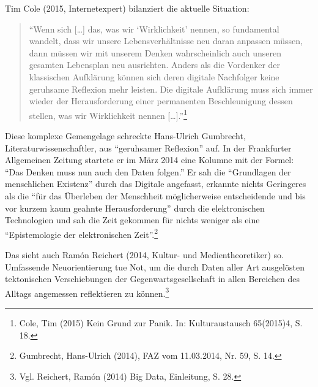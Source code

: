 \documentclass[a4paper,
fontsize=11pt,
oneside,
numbers=noperiodatend,
parskip=half-,
bibliography=totoc,
final
]{scrartcl}
\begin{document}
Tim Cole (2015, Internetexpert) bilanziert die aktuelle Situation:

\begin{quote}
\enquote{Wenn sich {[}\ldots{}{]} das, was wir \enquote{Wirklichkeit}
nennen, so fundamental wandelt, dass wir unsere Lebensverhältnisse neu
daran anpassen müssen, dann müssen wir mit unserem Denken wahrscheinlich
auch unseren gesamten Lebensplan neu ausrichten. Anders als die
Vordenker der klassischen Aufklärung können sich deren digitale
Nachfolger keine geruhsame Reflexion mehr leisten. Die digitale
Aufklärung muss sich immer wieder der Herausforderung einer permanenten
Beschleunigung dessen stellen, was wir Wirklichkeit nennen
{[}\ldots{}{]}.}\footnote{Cole, Tim (2015) Kein Grund zur Panik. In:
  Kulturaustausch 65(2015)4, S. 18.}
\end{quote}

Diese komplexe Gemengelage schreckte Hans-Ulrich Gumbrecht,
Literaturwissenschaftler, aus \enquote{geruhsamer Reflexion} auf. In der
Frankfurter Allgemeinen Zeitung startete er im März 2014 eine Kolumne
mit der Formel: \enquote{Das Denken muss nun auch den Daten folgen.} Er
sah die \enquote{Grundlagen der menschlichen Existenz} durch das
Digitale angefasst, erkannte nichts Geringeres als die \enquote{für das
Überleben der Menschheit möglicherweise entscheidende und bis vor kurzem
kaum geahnte Herausforderung} durch die elektronischen Technologien und
sah die Zeit gekommen für nichts weniger als eine \enquote{Epistemologie
der elektronischen Zeit}.\footnote{Gumbrecht, Hans-Ulrich (2014), FAZ
  vom 11.03.2014, Nr. 59, S. 14.}

Das sieht auch Ramón Reichert (2014, Kultur- und Medientheoretiker) so.
Umfassende Neuorientierung tue Not, um die durch Daten aller Art
ausgelösten tektonischen Verschiebungen der Gegenwartsgesellschaft in
allen Bereichen des Alltags angemessen reflektieren zu können.\footnote{Vgl.
  Reichert, Ramón (2014) Big Data, Einleitung, S. 28.}
\end{document}
